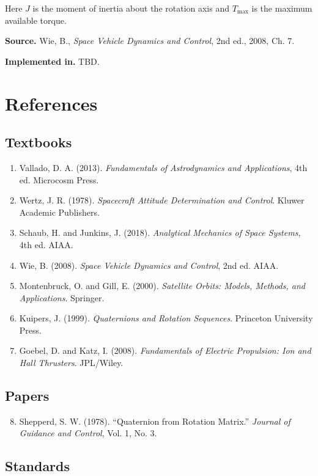 \documentclass[11pt]{article}
\begin{document}
Here $J$ is the moment of inertia about the rotation axis and
$T_{\max}$ is the maximum available torque.

\textbf{Source.} Wie, B., \emph{Space Vehicle Dynamics and Control}, 2nd
ed., 2008, Ch. 7.

\textbf{Implemented in.} TBD.

\section{References}

\subsection{Textbooks}

\begin{enumerate}[label=\arabic*.]
\item Vallado, D. A. (2013). \emph{Fundamentals of Astrodynamics and
Applications}, 4th ed. Microcosm Press.
\item Wertz, J. R. (1978). \emph{Spacecraft Attitude Determination and
Control}. Kluwer Academic Publishers.
\item Schaub, H. and Junkins, J. (2018). \emph{Analytical Mechanics of
Space Systems}, 4th ed. AIAA.
\item Wie, B. (2008). \emph{Space Vehicle Dynamics and Control}, 2nd ed.
AIAA.
\item Montenbruck, O. and Gill, E. (2000). \emph{Satellite Orbits:
Models, Methods, and Applications}. Springer.
\item Kuipers, J. (1999). \emph{Quaternions and Rotation Sequences}.
Princeton University Press.
\item Goebel, D. and Katz, I. (2008). \emph{Fundamentals of Electric
Propulsion: Ion and Hall Thrusters}. JPL/Wiley.
\end{enumerate}

\subsection{Papers}

\begin{enumerate}[label=\arabic*.]
\setcounter{enumi}{7}
\item Shepperd, S. W. (1978). ``Quaternion from Rotation Matrix.''
\emph{Journal of Guidance and Control}, Vol. 1, No. 3.
\end{enumerate}

\subsection{Standards}
\end{document}
